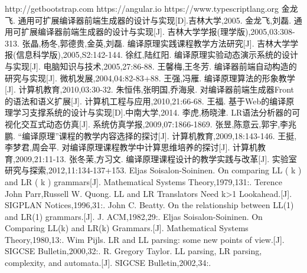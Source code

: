 \documentclass[a4paper]{article}
\newcommand{\小二}{\fontsize{18pt}{\baselineskip}\selectfont}
\newcommand{\小三}{\fontsize{15pt}{\baselineskip}\selectfont}
\newcommand{\小四}{\fontsize{12pt}{\baselineskip}\selectfont}
\begin{document}
\newpage
{}
\begin{thebibliography}{0}
http://getbootstrap.com
https://angular.io
https://www.typescriptlang.org
金龙飞. 通用可扩展编译器前端生成器的设计与实现[D].吉林大学,2005.
金龙飞,刘磊. 通用可扩展编译器前端生成器的设计与实现[J]. 吉林大学学报(理学版),2005,03:308-313.
张晶,杨冬,郭德贵,金英,刘磊. 编译原理实践课程教学方法研究[J]. 吉林大学学报(信息科学版),2005,S2:142-144.
徐红,陆红阳. 编译原理实验动态演示系统的设计与实现[J]. 电脑知识与技术,2005,27:86-88.
王馨梅,王冬芳. 编译器前端自动构造的研究与实现[J]. 微机发展,2004,04:82-83+88.
王强,冯雁. 编译原理算法的形象教学[J]. 计算机教育,2010,03:30-32.
朱恒伟,张明国,乔海泉. 对编译器前端生成器Front的语法和语义扩展[J]. 计算机工程与应用,2010,21:66-68.
王福. 基于Web的编译原理学习支撑系统的设计与实现[D].中南大学,2014.
李虎,杨晓津. LR语法分析器的可视化交互式动态仿真[J]. 系统仿真学报,2009,07:1866-1869.
张昱,陈意云,郭宇,李兆鹏. “编译原理”课程的教学内容选择的探讨[J]. 计算机教育,2009,18:143-146.
王挺,李梦君,周会平. 对编译原理课程教学中计算思维培养的探讨[J]. 计算机教育,2009,21:11-13.
张冬茉,方习文. 编译原理课程设计的教学实践与改革[J]. 实验室研究与探索,2012,11:134-137+153.
Eljas Soisalon-Soininen. On comparing LL ( k ) and LR ( k ) grammars[J]. Mathematical Systems Theory,1979,131:.
Terence John Parr,Russell W. Quong. LL and LR Translators Need k>1 Lookahead.[J]. SIGPLAN Notices,1996,31:.
John C. Beatty. On the relationship between LL(1) and LR(1) grammars.[J]. J. ACM,1982,29:.
Eljas Soisalon-Soininen. On Comparing LL(k) and LR(k) Grammars.[J]. Mathematical Systems Theory,1980,13:.
Wim Pijls. LR and LL parsing: some new points of view.[J]. SIGCSE Bulletin,2000,32:.
R. Gregory Taylor. LL parsing, LR parsing, complexity, and automata.[J]. SIGCSE Bulletin,2002,34:.
\end{thebibliography}
\appendix
\newpage

\newpage

\end{document}
